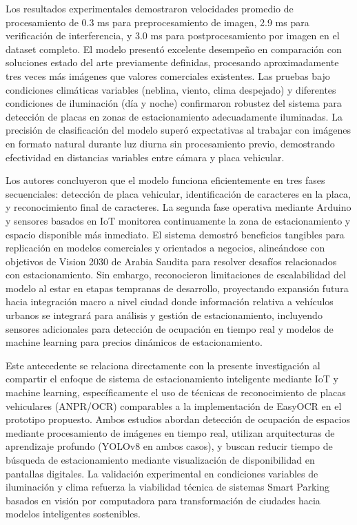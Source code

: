 \documentclass[12pt,a4paper]{article}
\begin{document}
Los resultados experimentales demostraron velocidades promedio de procesamiento de 0.3 ms para preprocesamiento de imagen, 2.9 ms para verificación de interferencia, y 3.0 ms para postprocesamiento por imagen en el dataset completo. El modelo presentó excelente desempeño en comparación con soluciones estado del arte previamente definidas, procesando aproximadamente tres veces más imágenes que valores comerciales existentes. Las pruebas bajo condiciones climáticas variables (neblina, viento, clima despejado) y diferentes condiciones de iluminación (día y noche) confirmaron robustez del sistema para detección de placas en zonas de estacionamiento adecuadamente iluminadas. La precisión de clasificación del modelo superó expectativas al trabajar con imágenes en formato natural durante luz diurna sin procesamiento previo, demostrando efectividad en distancias variables entre cámara y placa vehicular.

Los autores concluyeron que el modelo funciona eficientemente en tres fases secuenciales: detección de placa vehicular, identificación de caracteres en la placa, y reconocimiento final de caracteres. La segunda fase operativa mediante Arduino y sensores basados en IoT monitorea continuamente la zona de estacionamiento y espacio disponible más inmediato. El sistema demostró beneficios tangibles para replicación en modelos comerciales y orientados a negocios, alineándose con objetivos de Vision 2030 de Arabia Saudita para resolver desafíos relacionados con estacionamiento. Sin embargo, reconocieron limitaciones de escalabilidad del modelo al estar en etapas tempranas de desarrollo, proyectando expansión futura hacia integración macro a nivel ciudad donde información relativa a vehículos urbanos se integrará para análisis y gestión de estacionamiento, incluyendo sensores adicionales para detección de ocupación en tiempo real y modelos de machine learning para precios dinámicos de estacionamiento.

Este antecedente se relaciona directamente con la presente investigación al compartir el enfoque de sistema de estacionamiento inteligente mediante IoT y machine learning, específicamente el uso de técnicas de reconocimiento de placas vehiculares (ANPR/OCR) comparables a la implementación de EasyOCR en el prototipo propuesto. Ambos estudios abordan detección de ocupación de espacios mediante procesamiento de imágenes en tiempo real, utilizan arquitecturas de aprendizaje profundo (YOLOv8 en ambos casos), y buscan reducir tiempo de búsqueda de estacionamiento mediante visualización de disponibilidad en pantallas digitales. La validación experimental en condiciones variables de iluminación y clima refuerza la viabilidad técnica de sistemas Smart Parking basados en visión por computadora para transformación de ciudades hacia modelos inteligentes sostenibles.
\end{document}
